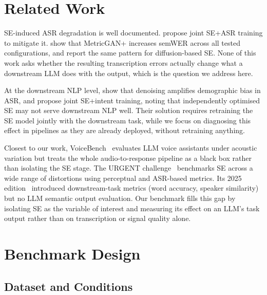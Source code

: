 \documentclass[11pt]{article}
\begin{document}
\section{Related Work}
\label{sec:related}

SE-induced ASR degradation is well documented.
\citet{lee2023d4am} propose joint SE+ASR training to mitigate it.
\citet{chondhekar2025noising} show that MetricGAN{+} increases semWER
across all tested configurations, and \citet{islam2026denoising}
report the same pattern for diffusion-based SE.
None of this work asks whether the resulting transcription errors
actually change what a downstream LLM does with the output, which
is the question we address here.

At the downstream NLP level, \citet{rai2024denoasr} show that
denoising amplifies demographic bias in ASR, and \citet{ali2022time}
propose joint SE+intent training, noting that independently optimised
SE may not serve downstream NLP well.
Their solution requires retraining the SE model jointly with the
downstream task, while we focus on diagnosing this effect in
pipelines as they are already deployed, without retraining anything.

Closest to our work, VoiceBench~\citep{chen2024voicebench, chen2026voicebench}
evaluates LLM voice assistants under acoustic variation but treats the
whole audio-to-response pipeline as a black box rather than isolating
the SE stage.
The URGENT challenge~\citep{zhang2024urgent} benchmarks SE across a
wide range of distortions using perceptual and ASR-based metrics.
Its 2025 edition~\citep{saijo2025interspeech} introduced
downstream-task metrics (word accuracy, speaker similarity) but
no LLM semantic output evaluation.
Our benchmark fills this gap by isolating SE as the variable of
interest and measuring its effect on an LLM's task output rather
than on transcription or signal quality alone.
 
\section{Benchmark Design}
\label{sec:method}
 
\subsection{Dataset and Conditions}
 
\end{document}
